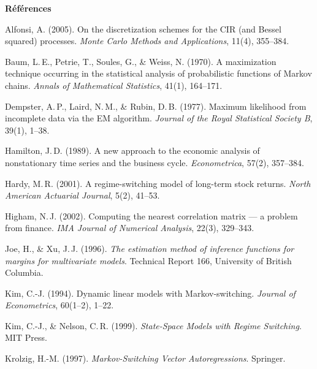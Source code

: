 \documentclass[11pt,a4paper]{article}
\theoremstyle{definition}
\begin{document}
\newpage
{}
{}
{\noindent\sffamily\Large\bfseries\color{nxnavy}Références\par}
\vspace{4mm}
{\small
\begin{list}{}{\setlength{\leftmargin}{1.2em}\setlength{\itemindent}{-1.2em}\setlength{\itemsep}{2pt}}
\item Alfonsi, A. (2005). On the discretization schemes for the CIR (and Bessel squared) processes. \emph{Monte Carlo Methods and Applications}, 11(4), 355--384.
\item Baum, L.\,E., Petrie, T., Soules, G., \& Weiss, N. (1970). A maximization technique occurring in the statistical analysis of probabilistic functions of Markov chains. \emph{Annals of Mathematical Statistics}, 41(1), 164--171.
\item Dempster, A.\,P., Laird, N.\,M., \& Rubin, D.\,B. (1977). Maximum likelihood from incomplete data via the EM algorithm. \emph{Journal of the Royal Statistical Society B}, 39(1), 1--38.
\item Hamilton, J.\,D. (1989). A new approach to the economic analysis of nonstationary time series and the business cycle. \emph{Econometrica}, 57(2), 357--384.
\item Hardy, M.\,R. (2001). A regime-switching model of long-term stock returns. \emph{North American Actuarial Journal}, 5(2), 41--53.
\item Higham, N.\,J. (2002). Computing the nearest correlation matrix --- a problem from finance. \emph{IMA Journal of Numerical Analysis}, 22(3), 329--343.
\item Joe, H., \& Xu, J.\,J. (1996). \emph{The estimation method of inference functions for margins for multivariate models}. Technical Report 166, University of British Columbia.
\item Kim, C.-J. (1994). Dynamic linear models with Markov-switching. \emph{Journal of Econometrics}, 60(1--2), 1--22.
\item Kim, C.-J., \& Nelson, C.\,R. (1999). \emph{State-Space Models with Regime Switching}. MIT Press.
\item Krolzig, H.-M. (1997). \emph{Markov-Switching Vector Autoregressions}. Springer.
\end{list}
}

\vspace{6mm}
\end{document}
